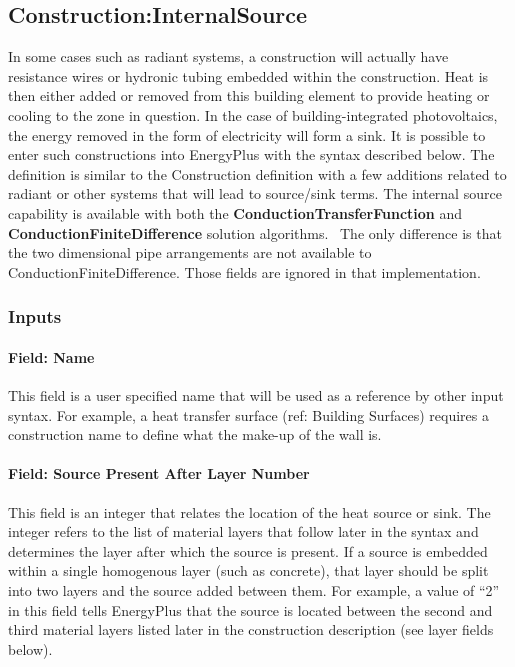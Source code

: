 \subsection{Construction:InternalSource}\label{constructioninternalsource}

In some cases such as radiant systems, a construction will actually have resistance wires or hydronic tubing embedded within the construction. Heat is then either added or removed from this building element to provide heating or cooling to the zone in question. In the case of building-integrated photovoltaics, the energy removed in the form of electricity will form a sink. It is possible to enter such constructions into EnergyPlus with the syntax described below. The definition is similar to the Construction definition with a few additions related to radiant or other systems that will lead to source/sink terms. The internal source capability is available with both the \textbf{ConductionTransferFunction} and \textbf{ConductionFiniteDifference} solution algorithms.~ The only difference is that the two dimensional pipe arrangements are not available to ConductionFiniteDifference. Those fields are ignored in that implementation.

\subsubsection{Inputs}\label{inputs-38}

\paragraph{Field: Name}\label{field-name-31-000}

This field is a user specified name that will be used as a reference by other input syntax. For example, a heat transfer surface (ref: Building Surfaces) requires a construction name to define what the make-up of the wall is.

\paragraph{Field: Source Present After Layer Number}\label{field-source-present-after-layer-number}

This field is an integer that relates the location of the heat source or sink. The integer refers to the list of material layers that follow later in the syntax and determines the layer after which the source is present. If a source is embedded within a single homogenous layer (such as concrete), that layer should be split into two layers and the source added between them. For example, a value of ``2'' in this field tells EnergyPlus that the source is located between the second and third material layers listed later in the construction description (see layer fields below).

